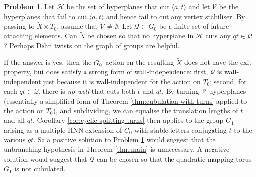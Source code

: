 \documentclass[11pt,oneside]{amsart}
\theoremstyle{definition}
\newtheorem{prob}[thm]{Problem}
\begin{document}
\begin{prob}\label{prob:super-dehn}
Let $\mathcal H$ be the set of hyperplanes that cut $\langle a,t\rangle$ and let $\mathcal V$ be the hyperplanes that fail to cut $\langle a,t\rangle$ and hence fail to cut any vertex stabiliser.  By passing to $\widetilde X\times T_0$, assume that $\mathcal V\neq\emptyset$. Let $\mathcal Q\subset G_0$ be a finite set of future attaching elements.  Can $\widetilde X$ be chosen so that no hyperplane in $\mathcal H$ cuts any $qt\in\mathcal Q$?  Perhaps Dehn twists on the graph of groups are helpful.
\end{prob}



If the answer is yes, then the $G_0$--action on the resulting $\widetilde X$ does not have the exit property, but does satisfy a strong form of wall-independence: first, $\mathcal Q$ is wall-independent just because it is wall-independent for the action on $T_0$; second, for each $qt\in\mathcal Q$, there is \emph{no wall} that cuts both $t$ and $qt$.  By turning $\mathcal V$--hyperplanes (essentially a simplified form of Theorem \ref{thm:cubulation-with-turns} applied to the action on $T_0$), and subdividing, we can equalise the translation lengths of $t$ and all $qt$.  Corollary \ref{cor:cyclic-splitting-turns} then applies to the group $G_1$ arising as a multiple HNN extension of $G_0$ with stable letters conjugating $t$ to the various $qt$.  So a positive solution to Problem \ref{prob:super-dehn} would suggest that the unbranching hypothesis in Theorem \ref{thm:main} is unnecessary.  A negative solution would suggest that $\mathcal Q$ can be chosen so that the quadratic mapping torus $G_1$ is not cubulated.



\end{document}
